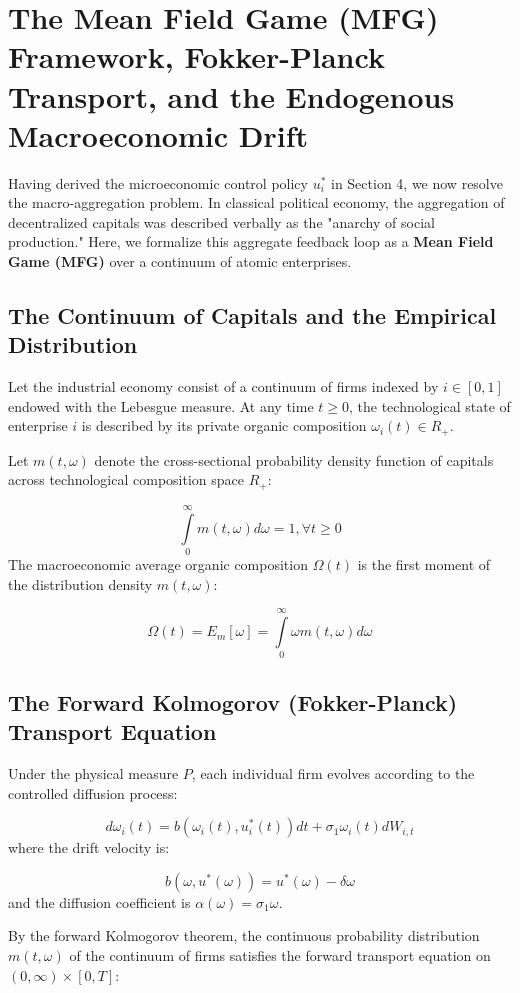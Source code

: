 \documentclass[11pt,letterpaper]{report}
\begin{document}
\section{The Mean Field Game (MFG) Framework, Fokker-Planck Transport, and the Endogenous Macroeconomic Drift}
Having derived the microeconomic control policy ${u}_{i}^{*}$ in Section 4, we now resolve the macro-aggregation problem. In classical political economy, the aggregation of decentralized capitals was described verbally as the "anarchy of social production." Here, we formalize this aggregate feedback loop as a \textbf{Mean Field Game (MFG)} over a continuum of atomic enterprises.

\subsection{The Continuum of Capitals and the Empirical Distribution}
Let the industrial economy consist of a continuum of firms indexed by $i\in [0,1]$ endowed with the Lebesgue measure. At any time $t\geq 0$, the technological state of enterprise $i$ is described by its private organic composition ${\omega }_{i}(t)\in {R}_{+}$.

Let $m(t,\omega )$ denote the cross-sectional probability density function of capitals across technological composition space ${R}_{+}$:

\[
\int\limits_{0}^{\infty }m(t,\omega )d\omega =1,\forall t\geq 0
\]
The macroeconomic average organic composition $\Omega (t)$ is the first moment of the distribution density $m(t,\omega )$:

\[
\Omega (t)={E}_{m}[\omega ]=\int\limits_{0}^{\infty }\omega m(t,\omega )d\omega
\]
\subsection{The Forward Kolmogorov (Fokker-Planck) Transport Equation}
Under the physical measure $P$, each individual firm evolves according to the controlled diffusion process:

\[
d{\omega }_{i}(t)=b({\omega }_{i}(t),{u}_{i}^{*}(t))dt+{\sigma }_{1}{\omega }_{i}(t)d{W}_{i,t}
\]
where the drift velocity is:

\[
b(\omega ,{u}^{*}(\omega ))={u}^{*}(\omega )-\delta \omega
\]
and the diffusion coefficient is $\alpha (\omega )={\sigma }_{1}\omega$.

By the forward Kolmogorov theorem, the continuous probability distribution $m(t,\omega )$ of the continuum of firms satisfies the forward transport equation on $(0,\infty )\times [0,T]$:
\end{document}
